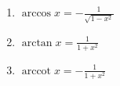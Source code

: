 \begin{center}
\begin{small}
\begin{enumerate}
\begin{math}
				      \arcsin x = \frac{1}{\sqrt {1 - x^2}}
			      \end{math}
			\item \begin{math}
				      \arccos x = - \frac{1}{\sqrt{1 - x^2}}
			      \end{math}
			\item \begin{math}
				      \arctan x = \frac{1}{1 + x^2}
			      \end{math}
			\item \begin{math}
				      \operatorname{arccot}x = -\frac{1}{1 + x^2}
			      \end{math}
		\end{enumerate}
	\end{small}
\end{center}

